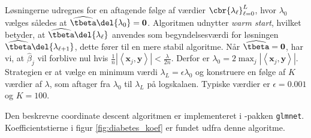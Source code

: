 %
Løsningerne udregnes for en aftagende følge af værdier \(\cbr{\lambda_{\ell}}_{\ell = 0}^L\), hvor \(\lambda_0\) vælges således at \(\widehat{\tbeta} \del{\lambda_0} =\mathbf{0}\). 
Algoritmen udnytter \textit{warm start}, hvilket betyder, at \(\widehat{\tbeta} \del{\lambda_\ell}\) anvendes som begyndelsesværdi for løsningen \(\widehat{\tbeta} \del{\lambda_{\ell + 1}}\), dette fører til en mere stabil algoritme. 
Når \(\widehat{\tbeta} = \mathbf{0}\), har vi, at \(\widehat{\beta}_j\) vil forblive nul hvis \(\frac{1}{n} \left\vert \left\langle \mathbf{x}_j, \mathbf{y} \right\rangle \right\vert < \frac{\lambda}{2n}\). Derfor er \( \lambda_0 = 2 \max_j \left\vert \left\langle \mathbf{x}_j, \mathbf{y} \right\rangle \right\vert\).
Strategien er at vælge en minimum værdi \(\lambda_L = \epsilon \lambda_0\) og konstruere en følge af \(K\) værdier af \(\lambda\), som aftager fra \(\lambda_0\) til \(\lambda_L\) på logskalaen.
Typiske værdier er \(\epsilon = 0.001\) og \(K =100\).
%
%


Den beskrevne coordinate descent algoritmen er implementeret i \Rlang-pakken \texttt{glmnet}.
Koefficientstierne i figur \ref{fig:diabetes_koef} er fundet udfra denne algoritme.
